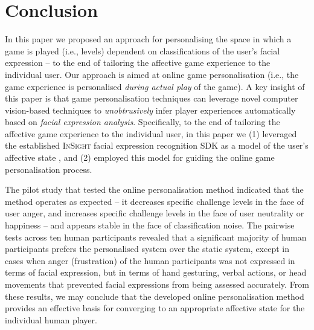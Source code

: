 \documentclass[letterpaper]{article}
\begin{document}
\section{Conclusion}\label{sec:conclusion}

In this paper we proposed an approach for personalising the space in which a game is played (i.e., levels) dependent on classifications of the user's facial expression -- to the end of tailoring the affective game experience to the individual user. Our approach is aimed at online game personalisation (i.e., the game experience is personalised \emph{during actual play} of the game). A key insight of this paper is that game personalisation techniques can leverage novel computer vision-based techniques to \emph{unobtrusively} infer player experiences automatically based on \emph{facial expression analysis}. Specifically, to the end of tailoring the affective game experience to the individual user, in this paper we (1) leveraged the established \textsc{InSight} facial expression recognition SDK as a model of the user's affective state \cite{InSight}, and (2) employed this model for guiding the online game personalisation process.

The pilot study that tested the online personalisation method indicated that the method operates as expected -- it decreases specific challenge levels in the face of user anger, and increases specific challenge levels in the face of user neutrality or happiness -- and appears stable in the face of classification noise. The pairwise tests across ten human participants revealed that a significant majority of human participants prefers the personalised system over the static system, except in cases when anger (frustration) of the human participants was not expressed in terms of facial expression, but in terms of hand gesturing, verbal actions, or head movements that prevented facial expressions from being assessed accurately. From these results, we may conclude that the developed online personalisation method provides an effective basis for converging to an appropriate affective state for the individual human player.
\end{document}
